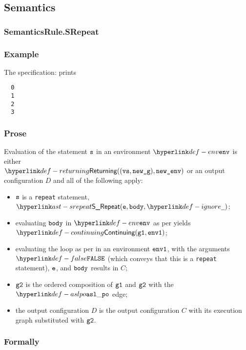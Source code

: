 \subsection{Semantics}
\subsubsection{SemanticsRule.SRepeat \label{sec:SemanticsRule.SRepeat}}
\subsubsection{Example}
The specification:
prints
\begin{Verbatim}
  0
  1
  2
  3
\end{Verbatim}

\subsubsection{Prose}
Evaluation of the statement $\vs$ in an environment $\env$ is
either \\ $\Returning((\vvs, \newg), \newenv)$ or an output configuration $D$ and all of the following apply:
\begin{itemize}
  \item $\vs$ is a \texttt{repeat} statement, $\SRepeat(\ve, \vbody, \Ignore)$;
  \item evaluating $\vbody$ in $\env$ as per 
        yields $\Continuing(\vgone, \envone)$\ProseTerminateAs{\ReturningConfig,\ThrowingConfig,\ErrorConfig};
  \item evaluating the loop as per  in an environment $\envone$,
        with the arguments $\False$ (which conveys that this is a \texttt{repeat} statement), $\ve$, and $\vbody$
        results in $C$;
  \item $\vgtwo$ is the ordered composition of $\vgone$ and $\vgtwo$ with the $\aslpo$ edge;
  \item the output configuration $D$ is the output configuration $C$ with its execution graph
        substituted with $\vgtwo$.
\end{itemize}
\subsubsection{Formally}
\begin{mathpar}
\end{mathpar}


